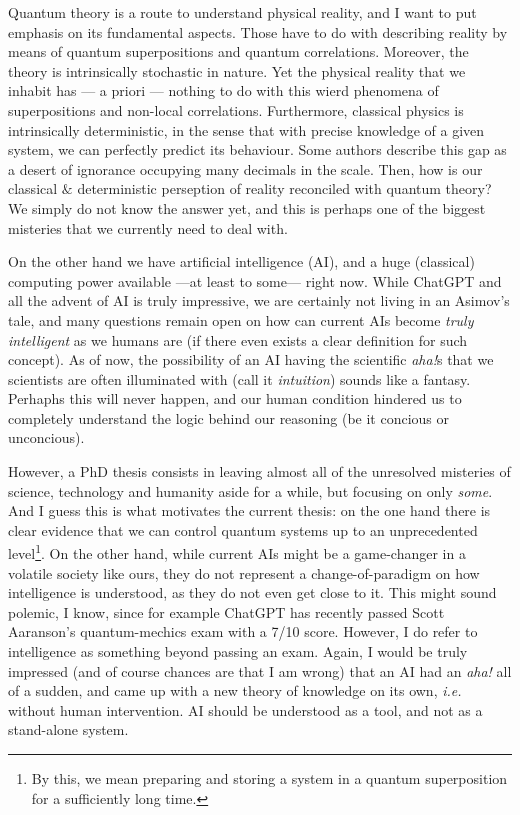 Quantum theory is a route to understand physical reality, and I want to put emphasis on its fundamental aspects. Those have to do with describing reality by means of quantum superpositions and quantum correlations. Moreover, the theory is intrinsically stochastic in nature. Yet the physical reality that we inhabit has --- a priori --- nothing to do with this wierd phenomena of superpositions and non-local correlations. Furthermore, classical physics is intrinsically deterministic, in the sense that with precise knowledge of a given system, we can perfectly predict its behaviour. Some authors describe this gap as a desert of ignorance occupying many decimals in the scale. Then, how is our classical $\&$ deterministic perseption of reality reconciled with quantum theory? We simply do not know the answer yet, and this is perhaps one of the biggest misteries that we currently need to deal with.

On the other hand we have artificial intelligence (AI), and a huge (classical) computing power available ---at least to some--- right now. While ChatGPT and all the advent of AI is truly impressive, we are certainly not living in an Asimov's tale, and many questions remain open on how can current AIs become \textit{truly intelligent} as we humans are (if there even exists a clear definition for such concept). As of now, the possibility of an AI having the scientific \textit{aha!}s that we scientists are often illuminated with (call it \textit{intuition}) sounds like a fantasy. Perhaphs this will never happen, and our human condition hindered us to completely understand the logic behind our reasoning (be it concious or unconcious).

However, a PhD thesis consists in leaving almost all of the unresolved misteries of science, technology and humanity aside for a while, but focusing on only \textit{some}. And I guess this is what motivates the current thesis: on the one hand there is clear evidence that we can control quantum systems up to an unprecedented level\footnote{By this, we mean preparing and storing a system in a quantum superposition for a sufficiently long time.}. On the other hand, while current AIs might be a game-changer in a volatile society like ours, they do not represent a change-of-paradigm on how intelligence is understood, as they do not even get close to it. This might sound polemic, I know, since for example ChatGPT has recently passed Scott Aaranson's quantum-mechics exam with a 7/10 score. However, I do refer to intelligence as something beyond passing an exam. Again, I would be truly impressed (and of course chances are that I am wrong) that an AI had an \textit{aha!} all of a sudden, and came up with a new theory of knowledge on its own, \textit{i.e.} without human intervention. AI should be understood as a tool, and not as a stand-alone system.

